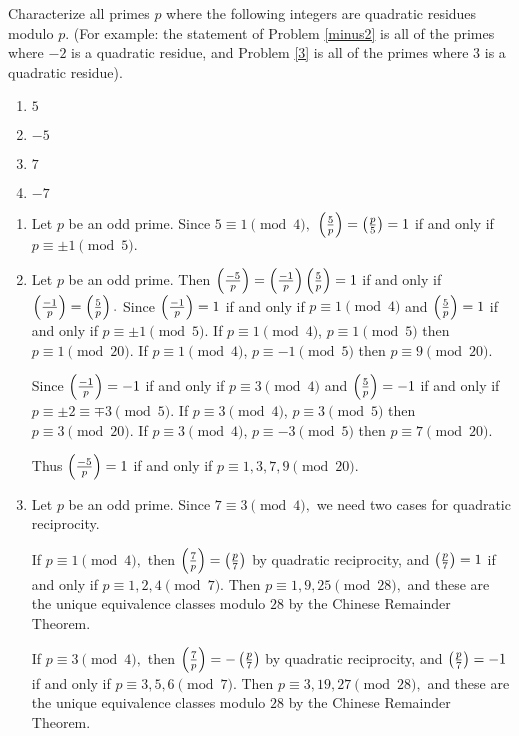 \documentclass[letterpaper, 11pt]{ximera}
\begin{document}
\begin{ex}
 	Characterize all primes $p$ where the following  integers are quadratic residues modulo $p$. (For example: the statement of Problem \ref{minus2} is all of the primes where $-2$ is a quadratic residue, and Problem \ref{3} is all of the primes where $3$ is a quadratic residue).
	\begin{enumerate}[label=(\alph*)]
		 \item $5$
		 \item $-5$
		 \item\label{7} $7$
		 \item $-7$
	\end{enumerate}

	\begin{solution}
	\begin{enumerate}[label=(\alph*)]
		\item Let $p$ be an odd prime. Since $5\equiv 1\pmod{4},$ $\left(\frac{5}{p}\right)=\left(\frac{p}{5}\right)=1$ if and only if $p\equiv \pm1\pmod{5}.$
		
		\item Let $p$ be an odd prime. Then $\left(\frac{-5}{p}\right)=\left(\frac{-1}{p}\right)\left(\frac{5}{p}\right)=1$ if and only if $\left(\frac{-1}{p}\right)=\left(\frac{5}{p}\right).$ Since $\left(\frac{-1}{p}\right)=1$ if and only if $p\equiv 1\pmod{4}$ and $\left(\frac{5}{p}\right)=1$ if and only if $p\equiv \pm 1\pmod{5}.$
		If $p\equiv 1\pmod{4}$, $p\equiv 1\pmod{5}$ then $p\equiv 1\pmod{20}.$ If $p\equiv 1\pmod{4}$, $p\equiv -1\pmod{5}$ then $p\equiv 9\pmod{20}.$

		Since $\left(\frac{-1}{p}\right)=-1$ if and only if $p\equiv 3\pmod{4}$ and $\left(\frac{5}{p}\right)=-1$ if and only if $p\equiv \pm 2\equiv \mp 3\pmod{5}.$
		If $p\equiv 3\pmod{4}$, $p\equiv 3\pmod{5}$ then $p\equiv 3\pmod{20}.$ If $p\equiv 3\pmod{4}$, $p\equiv -3\pmod{5}$ then $p\equiv 7\pmod{20}.$

		Thus $\left(\frac{-5}{p}\right)=1$ if and only if $p\equiv 1,3,7,9\pmod{20}.$
		
		\item Let $p$ be an odd prime. Since $7\equiv {3}\pmod{4},$ we need two cases for quadratic reciprocity. 
			
		If $p\equiv 1\pmod{4},$ then $\left(\frac{7}{p}\right)={\left(\frac{p}{7}\right)}$ by quadratic reciprocity, and $\left(\frac{p}{7}\right)=1$ if and only if $p\equiv 1,2,4\pmod{7}$. Then $p\equiv 1,9,25\pmod{28},$ and these are the unique equivalence classes modulo $28$ by the Chinese Remainder Theorem.
				
		If $p\equiv 3\pmod{4},$ then $\left(\frac{7}{p}\right)={-\left(\frac{p}{7}\right)}$ by quadratic reciprocity, and $\left(\frac{p}{7}\right)=-1$ if and only if $p\equiv 3,5,6\pmod{7}$. Then $p\equiv 3,19,27\pmod{28},$ and these are the unique equivalence classes modulo $28$ by the Chinese Remainder Theorem.


\end{enumerate}
\end{solution}
\end{ex}
\end{document}
